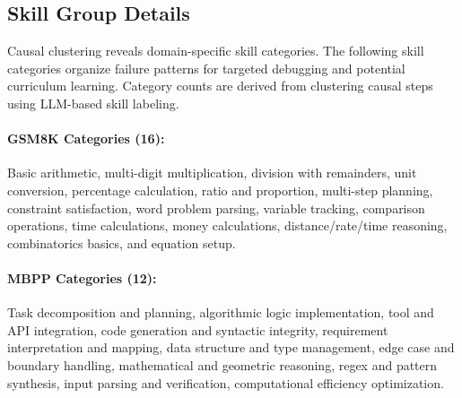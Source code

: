 \documentclass{article}
\theoremstyle{plain}
\theoremstyle{definition}
\theoremstyle{remark}
\begin{document}
\begin{table}[h]
  \caption{Dataset and trace statistics. \textbf{Total / Avg.} row shows sums for counts and macro-averages for rates. Accuracy = Passed/Total.}
  \label{tab:dataset_stats}
  \centering
\end{table}

\subsection{Skill Group Details}

Causal clustering reveals domain-specific skill categories. The following skill categories organize failure patterns for targeted debugging and potential curriculum learning. Category counts are derived from clustering causal steps using LLM-based skill labeling.

\paragraph{GSM8K Categories (16):}
Basic arithmetic, multi-digit multiplication, division with remainders, unit conversion, percentage calculation, ratio and proportion, multi-step planning, constraint satisfaction, word problem parsing, variable tracking, comparison operations, time calculations, money calculations, distance/rate/time reasoning, combinatorics basics, and equation setup.

\paragraph{MBPP Categories (12):}
Task decomposition and planning, algorithmic logic implementation, tool and API integration, code generation and syntactic integrity, requirement interpretation and mapping, data structure and type management, edge case and boundary handling, mathematical and geometric reasoning, regex and pattern synthesis, input parsing and verification, computational efficiency optimization.
\end{document}
